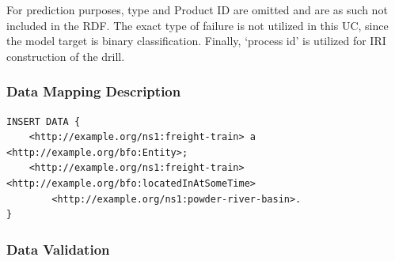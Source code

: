 For prediction purposes, type and Product ID are omitted and are as such not included in the RDF. The exact type of failure is not utilized in this UC, since the model target is binary classification. Finally, `process id' is utilized for IRI construction of the drill.

\subsubsection*{Data Mapping Description}

\begin{verbatim}
INSERT DATA {
    <http://example.org/ns1:freight-train> a <http://example.org/bfo:Entity>;
    <http://example.org/ns1:freight-train> <http://example.org/bfo:locatedInAtSomeTime> 
        <http://example.org/ns1:powder-river-basin>.
}
\end{verbatim}

\subsubsection*{Data Validation}
